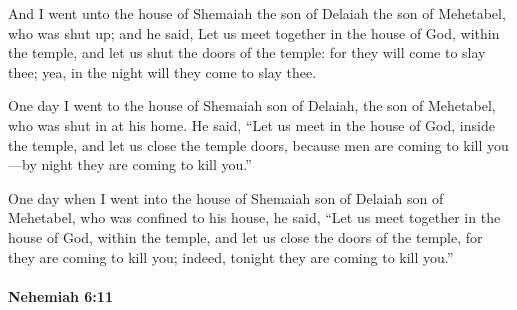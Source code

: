 			\begin{versebox}
					\item[BHS] 
					\item[LXX] 
					\item[ASV] And I went unto the house of Shemaiah the son of Delaiah the son of Mehetabel, who was shut up; and he said, Let us meet together in the house of God, within the temple, and let us shut the doors of the temple: for they will come to slay thee; yea, in the night will they come to slay thee.
					\item[NIV] One day I went to the house of Shemaiah son of Delaiah, the son of Mehetabel, who was shut in at his home. He said, “Let us meet in the house of God, inside the temple, and let us close the temple doors, because men are coming to kill you—by night they are coming to kill you.”
					\item[NRSV] One day when I went into the house of Shemaiah son of Delaiah son of Mehetabel, who was confined to his house, he said, “Let us meet together in the house of God, within the temple, and let us close the doors of the temple, for they are coming to kill you; indeed, tonight they are coming to kill you.”
			\end{versebox}

		\paragraph{Nehemiah 6:11} %
			\label{NEHEMIAH-6-11}


